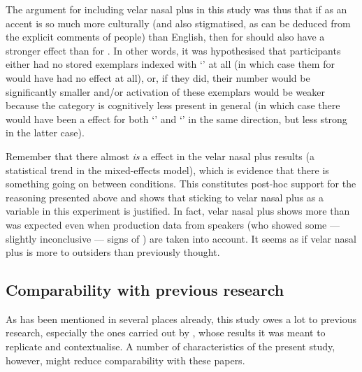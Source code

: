 The argument for including velar nasal plus in this study was thus that if  as an accent is so much more culturally  (and also stigmatised, as can be deduced from the explicit comments of people) than  English, then  for  should also have a stronger effect than  for .
In other words, it was hypothesised that participants either had no stored exemplars indexed with `' at all (in which case  them for  would have had no effect at all), or, if they did, their number would be significantly smaller and/or activation of these exemplars would be weaker because the category is cognitively less present in general (in which case there would have been a  effect for both `' and `' in the same direction, but less strong in the latter case).

Remember that there almost \emph{is} a  effect in the velar nasal plus results (a statistical trend in the mixed-effects model), which is evidence that there is something going on between  conditions.
This constitutes post-hoc support for the reasoning presented above and shows that sticking to velar nasal plus as a variable in this experiment is justified.
In fact, velar nasal plus shows more  than was expected even when production data from  speakers (who showed some --- slightly inconclusive --- signs of ) are taken into account.
It seems as if velar nasal plus is more  to outsiders than previously thought.

		\subsection{Comparability with previous research}

As has been mentioned in several places already, this study owes a lot to previous research, especially the ones carried out by \textcite{niedzielski1999,hayetal2006a,hayetal2006b,haydrager2010}, whose results it was meant to replicate and contextualise.
A number of characteristics of the present study, however, might reduce comparability with these papers.

